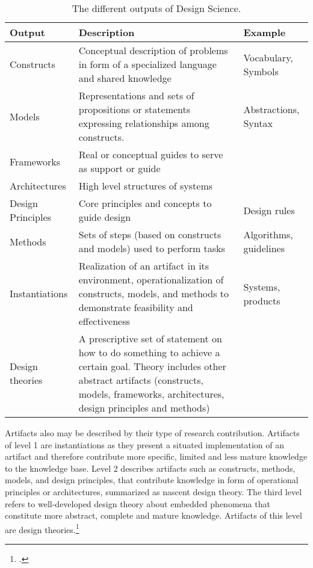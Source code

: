 \begin{table}
\setlength\extrarowheight{2pt} %
  \centering
  \begin{tabularx}{\textwidth}{|l|X|l|}
    \hline
        \textbf{Output} & \textbf{Description} & \textbf{Example}  \\ \hline\hline
        Constructs & Conceptual description of problems in form of a specialized language and shared knowledge & Vocabulary, Symbols \\
        Models & Representations and sets of propositions or statements expressing relationships among constructs. & Abstractions, Syntax \\
        Frameworks & Real or conceptual guides to serve as support or guide & \\
        Architectures & High level structures of systems & \\ 
        Design Principles & Core principles and concepts to guide design & Design rules \\
        Methods & Sets of steps (based on constructs and models) used to perform tasks & Algorithms, guidelines \\
        Instantiations & Realization of an artifact in its environment, operationalization of constructs, models, and methods to demonstrate feasibility and effectiveness & Systems, products \\
        Design theories & A prescriptive set of statement on how to do something to achieve a certain goal. Theory includes other abstract artifacts (constructs, models, frameworks, architectures, design principles and methods) & \\ \hline
    \end{tabularx}
    \caption[The different outputs of Design Science.]{The different outputs of Design Science.\footnotemark }
    \label{tab:Artifacts}
\end{table}

Artifacts also may be described by their type of research contribution. Artifacts of level 1 are instantiations as they present a situated implementation of an artifact and therefore contribute more specific, limited and less mature knowledge to the knowledge base. Level 2 describes artifacts such as constructs, methods, models, and design principles, that contribute knowledge in form of operational principles or architectures, summarized as nascent design theory. The third level refers to well-developed design theory about embedded phenomena that constitute more abstract, complete and mature knowledge. Artifacts of this level are design theories.\footcite[Cf.][p.340]{GregorPositioningpresentingdesign2013}

